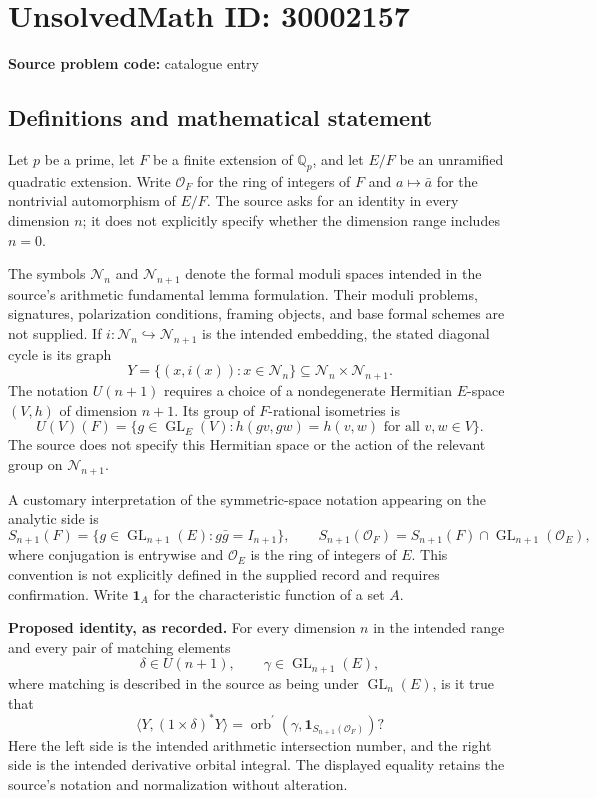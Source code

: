 \documentclass[11pt]{article}
\newcommand{\Q}{\mathbb{Q}}
\begin{document}
\section*{UnsolvedMath ID: 30002157}
\textbf{Source problem code:} catalogue entry
\subsection{Definitions and mathematical statement}
Let \(p\) be a prime, let \(F\) be a finite extension of \(\Q_p\), and let \(E/F\) be an unramified quadratic extension. Write \(\mathcal O_F\) for the ring of integers of \(F\) and \(a\mapsto\bar a\) for the nontrivial automorphism of \(E/F\). The source asks for an identity in every dimension \(n\); it does not explicitly specify whether the dimension range includes \(n=0\).

The symbols \(\mathcal N_n\) and \(\mathcal N_{n+1}\) denote the formal moduli spaces intended in the source's arithmetic fundamental lemma formulation. Their moduli problems, signatures, polarization conditions, framing objects, and base formal schemes are not supplied. If \(i:\mathcal N_n\hookrightarrow\mathcal N_{n+1}\) is the intended embedding, the stated diagonal cycle is its graph
\[
Y=\{(x,i(x)):x\in\mathcal N_n\}\subseteq\mathcal N_n\times\mathcal N_{n+1}.
\]
The notation \(U(n+1)\) requires a choice of a nondegenerate Hermitian \(E\)-space \((V,h)\) of dimension \(n+1\). Its group of \(F\)-rational isometries is
\[
U(V)(F)=\{g\in\operatorname{GL}_E(V):h(gv,gw)=h(v,w)\text{ for all }v,w\in V\}.
\]
The source does not specify this Hermitian space or the action of the relevant group on \(\mathcal N_{n+1}\).

A customary interpretation of the symmetric-space notation appearing on the analytic side is
\[
S_{n+1}(F)=\{g\in\operatorname{GL}_{n+1}(E):g\bar g=I_{n+1}\},\qquad
S_{n+1}(\mathcal O_F)=S_{n+1}(F)\cap\operatorname{GL}_{n+1}(\mathcal O_E),
\]
where conjugation is entrywise and \(\mathcal O_E\) is the ring of integers of \(E\). This convention is not explicitly defined in the supplied record and requires confirmation. Write \(\mathbf 1_A\) for the characteristic function of a set \(A\).

\textbf{Proposed identity, as recorded.} For every dimension \(n\) in the intended range and every pair of matching elements
\[
\delta\in U(n+1),\qquad \gamma\in\operatorname{GL}_{n+1}(E),
\]
where matching is described in the source as being under \(\operatorname{GL}_n(E)\), is it true that
\[
\bigl\langle Y,(1\times\delta)^*Y\bigr\rangle
=
\operatorname{orb}^{\prime}\!\left(\gamma,\mathbf 1_{S_{n+1}(\mathcal O_F)}\right)?
\]
Here the left side is the intended arithmetic intersection number, and the right side is the intended derivative orbital integral. The displayed equality retains the source's notation and normalization without alteration.
\end{document}
